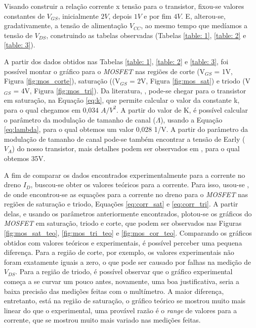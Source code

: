 \documentclass{article}
\begin{document}
Visando construir a relação corrente x tensão para o transistor, fixou-se valores constantes de $V_{GS}$, inicialmente $2V$, depois $1V$ e por fim $4V$. E, alterou-se, gradativamente, a tensão de alimentação $V_{CC}$, ao mesmo tempo que medíamos a tensão de $V_{DS}$, construindo as tabelas observadas (Tabelas \ref{table: 1}, \ref{table: 2} e \ref{table: 3}).

A partir dos dados obtidos nas Tabelas \ref{table: 1}, \ref{table: 2} e \ref{table: 3}, foi possível montar o gráfico para o \emph{MOSFET} nas regiões de corte (V$_{GS}$ = 1V, Figura \ref{fig:mos_corte}), saturação ((V$_{GS}$ = 2V, Figura \ref{fig:mos_sat}) e triodo (V$_{GS}$ = 4V, Figura \ref{fig:mos_tri}). Da literatura, \cite{Sedra2004}, pode-se chegar para o transistor em saturação, na Equação \ref{eq:k}, que permite calcular o valor da constante k, para o qual chegamos em 0,034 $A/V^2$. A partir do valor de K, é possível calcular o parâmetro da modulação de tamanho de canal ($\Lambda$), usando a Equação \ref{eq:lambda}, para o qual obtemos um valor 0,028 1/V. A partir do parâmetro da modulação de tamanho de canal pode-se também encontrar a tensão de Early ($V_A$) do nosso transistor, mais detalhes podem ser observados em , para o qual obtemos 35V.

A fim de comparar os dados encontrados experimentalmente para a corrente no dreno $I_D$, buscou-se obter os valores teóricos para a corrente. Para isso, usou-se \cite{Sedra2004}, de onde encontrou-se as equações para a corrente no dreno para o \emph{MOSFET} nas regiões de saturação e triodo, Equações \ref{eq:corr_sat} e \ref{eq:corr_tri}. A partir delas, e usando os parâmetros anteriormente encontrados, plotou-se os gráficos do \emph{MOSFET} em saturação, triodo e corte, que podem ser observados nas Figuras \ref{fig:mos_sat_teo}, \ref{fig:mos_tri_teo} e \ref{fig:mos_cor_teo}. Comparando os gráficos obtidos com valores teóricos e experimentais, é possível perceber uma pequena diferença. Para a região de corte, por exemplo, os valores experimentais não foram exatamente iguais a zero, o que pode ser causado por falhas na medição de $V_{DS}$. Para a região de triodo, é possível observar que o gráfico experimental começa a se curvar um pouco antes, novamente, uma boa justificativa, seria a baixa precisão das medições feitas com o multímetro. A maior diferença, entretanto, está na região de saturação, o gráfico teórico se mostrou muito mais linear do que o experimental, uma provável razão é o \emph{range} de valores para a corrente, que se mostrou muito mais variado nas medições feitas.
\end{document}
